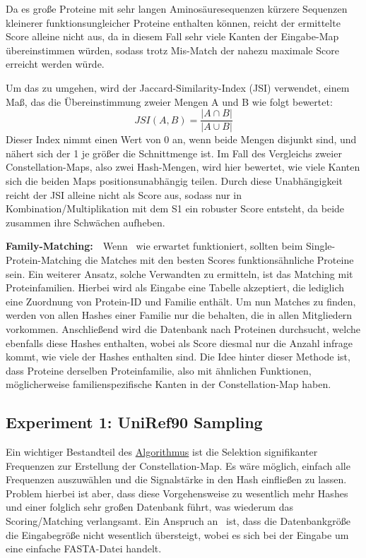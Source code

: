         Da es große Proteine mit sehr langen Aminosäuresequenzen kürzere Sequenzen kleinerer funktionsungleicher Proteine enthalten können, reicht der ermittelte Score alleine nicht aus, da in diesem Fall sehr viele Kanten der Eingabe-Map übereinstimmen würden, sodass trotz Mis-Match der nahezu maximale Score erreicht werden würde.

        Um das zu umgehen, wird der Jaccard-Similarity-Index (JSI) verwendet, einem Maß, das die Übereinstimmung zweier Mengen A und B wie folgt bewertet:
        $$JSI(A, B)=\frac{|A \cap B|}{|A \cup B|}$$
        Dieser Index nimmt einen Wert von 0 an, wenn beide Mengen disjunkt sind, und nähert sich der 1 je größer die Schnittmenge ist. Im Fall des Vergleichs zweier Constellation-Maps, also zwei Hash-Mengen, wird hier bewertet, wie viele Kanten sich die beiden Maps positionsunabhängig teilen. Durch diese Unabhängigkeit reicht der JSI alleine nicht als Score aus, sodass nur in Kombination/Multiplikation mit dem S1 ein robuster Score entsteht, da beide zusammen ihre Schwächen aufheben.

        \vspace{2.25mm}
        \textbf{Family-Matching:}\ \ Wenn \protfin\ wie erwartet funktioniert, sollten beim Single-Protein-Matching die Matches mit den besten Scores funktionsähnliche Proteine sein. Ein weiterer Ansatz, solche Verwandten zu ermitteln, ist das Matching mit Proteinfamilien. Hierbei wird als Eingabe eine Tabelle akzeptiert, die lediglich eine Zuordnung von Protein-ID und Familie enthält. Um nun Matches zu finden, werden von allen Hashes einer Familie nur die behalten, die in allen Mitgliedern vorkommen. Anschließend wird die Datenbank nach Proteinen durchsucht, welche ebenfalls diese Hashes enthalten, wobei als Score diesmal nur die Anzahl infrage kommt, wie viele der Hashes enthalten sind. Die Idee hinter dieser Methode ist, dass Proteine derselben Proteinfamilie, also mit ähnlichen Funktionen, möglicherweise familienspezifische Kanten in der Constellation-Map haben.
    \subsection{Experiment 1: UniRef90 Sampling} %
        \label{sub:experiment_1_uniref90_sampling}
        Ein wichtiger Bestandteil des \hyperref[sec:grundalgorithmus]{Algorithmus} ist die Selektion signifikanter Frequenzen zur Erstellung der Constellation-Map. Es wäre möglich, einfach alle Frequenzen auszuwählen und die Signalstärke in den Hash einfließen zu lassen. Problem hierbei ist aber, dass diese Vorgehensweise zu wesentlich mehr Hashes und einer folglich sehr großen Datenbank führt, was wiederum das Scoring/Matching verlangsamt. Ein Anspruch an \protfin\ ist, dass die Datenbankgröße die Eingabegröße nicht wesentlich übersteigt, wobei es sich bei der Eingabe um eine einfache FASTA-Datei handelt.

